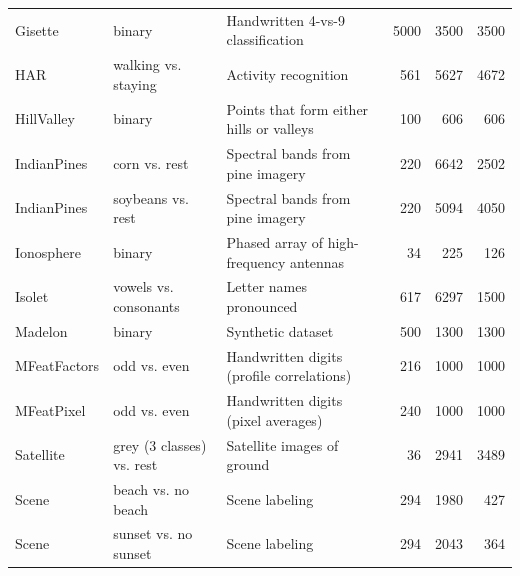\documentclass[
	fontsize=11pt, %
	twoside=false, %
	open=any, %
	secnumdepth=1, %
]{kaobook}
\begin{document}
\begin{table}[hbtp]
\begin{tabular}{p{2.5cm}p{3.5cm}p{5.2cm}rrr}
      Gisette  \cite{guyon2004result}                            & binary                    & Handwritten 4-vs-9 classification         & 5000      & 3500      & 3500      \\
      HAR \cite{anguita2013public}                               & walking vs. staying       & Activity recognition                      & 561       & 5627      & 4672      \\
      HillValley \cite{Dua:2019}                                 & binary                    & Points that form either hills or valleys  & 100       & 606       & 606       \\
      IndianPines \cite{PURR1947}                                & corn vs. rest             & Spectral bands from pine imagery          & 220       & 6642      & 2502      \\
      IndianPines \cite{PURR1947}                                & soybeans vs. rest         & Spectral bands from pine imagery          & 220       & 5094      & 4050      \\
      Ionosphere \cite{sigillito1989classification}              & binary                    & Phased array of high-frequency antennas   & 34        & 225       & 126       \\
      Isolet \cite{fanty1990spoken}                              & vowels vs. consonants     & Letter names pronounced                   & 617       & 6297      & 1500      \\
      Madelon \cite{guyon2004result}                             & binary                    & Synthetic dataset                         & 500       & 1300      & 1300      \\
      MFeatFactors\cite{jain2000statistical}                     & odd vs. even              & Handwritten digits (profile correlations) & 216       & 1000      & 1000      \\
      MFeatPixel                                                 & odd vs. even              & Handwritten digits (pixel averages)       & 240       & 1000      & 1000      \\
      Satellite \cite{goldstein2016comparative}                  & grey (3 classes) vs. rest & Satellite images of ground                & 36        & 2941      & 3489      \\
      Scene \cite{boutell2004learning}                           & beach vs. no beach        & Scene labeling                            & 294       & 1980      & 427       \\
      Scene \cite{boutell2004learning}                           & sunset vs. no sunset      & Scene labeling                            & 294       & 2043      & 364       \\

\end{tabular}
\end{table}
\end{document}
